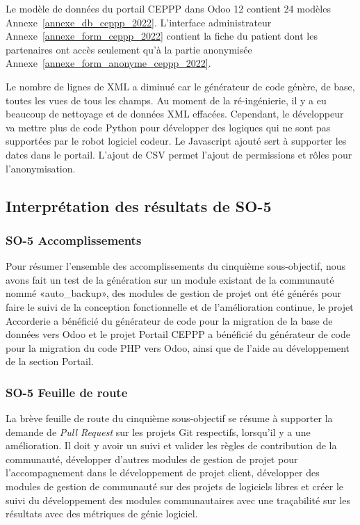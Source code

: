 Le modèle de données du portail CEPPP dans Odoo 12 contient 24 modèles Annexe~\ref{annexe_db_ceppp_2022}. L'interface administrateur Annexe~\ref{annexe_form_ceppp_2022} contient la fiche du patient dont les partenaires ont accès seulement qu'à la partie anonymisée Annexe~\ref{annexe_form_anonyme_ceppp_2022}.

Le nombre de lignes de XML a diminué car le générateur de code génère, de base, toutes les vues de tous les champs. Au moment de la ré-ingénierie, il y a eu beaucoup de nettoyage et de données XML effacées. Cependant, le développeur va mettre plus de code Python pour développer des logiques qui ne sont pas supportées par le robot logiciel codeur. Le Javascript ajouté sert à supporter les dates dans le portail. L’ajout de CSV permet l’ajout de permissions et rôles pour l’anonymisation.

\subsection{Interprétation des résultats de SO-5}

\subsubsection{SO-5 Accomplissements}
Pour résumer l'ensemble des accomplissements du cinquième sous-objectif, nous avons fait un test de la génération sur un module existant de la communauté nommé «auto\_backup», des modules de gestion de projet ont été générés pour faire le suivi de la conception fonctionnelle et de l’amélioration continue, le projet Accorderie a bénéficié du générateur de code pour la migration de la base de données vers Odoo et le projet Portail CEPPP a bénéficié du générateur de code pour la migration du code PHP vers Odoo, ainsi que de l’aide au développement de la section Portail.

\subsubsection{SO-5 Feuille de route}
La brève feuille de route du cinquième sous-objectif se résume à supporter la demande de \textit{\textit{Pull Request}} sur les projets Git respectifs, lorsqu’il y a une amélioration. Il doit y avoir un suivi et valider les règles de contribution de la communauté, développer d’autres modules de gestion de projet pour l’accompagnement dans le développement de projet client, développer des modules de gestion de communauté sur des projets de logiciels libres et créer le suivi du développement des modules communautaires avec une traçabilité sur les résultats avec des métriques de génie logiciel.

